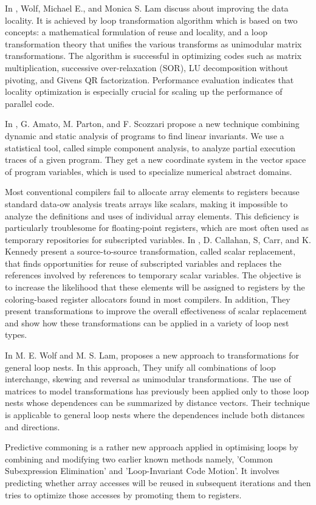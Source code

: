 In \cite{wolf1991data}, Wolf, Michael E., and Monica S. Lam discuss about improving the data locality. It is achieved by loop transformation algorithm which is based on two concepts: a mathematical formulation of reuse and locality, and a loop transformation theory that unifies the various transforms as unimodular matrix transformations. The algorithm is successful in optimizing codes such as matrix multiplication, successive over-relaxation (SOR), LU decomposition without pivoting, and Givens QR factorization. Performance evaluation indicates that locality optimization is especially crucial for scaling up the performance of parallel code.


In \cite{amato2012discovering}, G. Amato, M. Parton, and F. Scozzari propose a new technique combining dynamic and static analysis of programs to find linear invariants. We use a statistical tool, called simple component analysis, to analyze partial execution traces of a given program. They get a new coordinate system in the vector space of program variables, which is used to specialize numerical abstract domains.

Most conventional compilers fail to allocate array elements to registers because standard data-ow analysis treats arrays like scalars, making it impossible to analyze the definitions and uses of individual array elements. This deficiency is particularly troublesome for floating-point registers, which are most often used as temporary repositories for subscripted variables. In \cite{callahan1990improving}, D. Callahan, S, Carr, and K. Kennedy present a source-to-source transformation, called scalar replacement, that finds opportunities for reuse of subscripted variables and replaces the references involved by references to temporary scalar variables. The objective is to increase the likelihood that these elements will be assigned to registers by the coloring-based register allocators found in most compilers. In addition, They present transformations to improve the overall effectiveness of scalar replacement and show how these transformations can be applied in a variety of loop nest types.

In \cite{wolf1991loop} M. E. Wolf and M. S. Lam, proposes a new approach to transformations for general loop nests. In this approach, They unify all combinations of loop interchange, skewing and reversal as unimodular transformations. The use of matrices to model transformations has previously been applied only to those loop nests whose dependences can be summarized by distance vectors. Their technique is applicable to general loop nests where the dependences include both distances and directions.

Predictive commoning is a rather new approach applied in optimising loops by combining and modifying two earlier known methods namely, ’Common Subexpression Elimination’ and ’Loop-Invariant Code Motion’. It involves predicting whether array accesses will be reused in subsequent iterations and then tries to optimize those accesses by promoting them to registers.